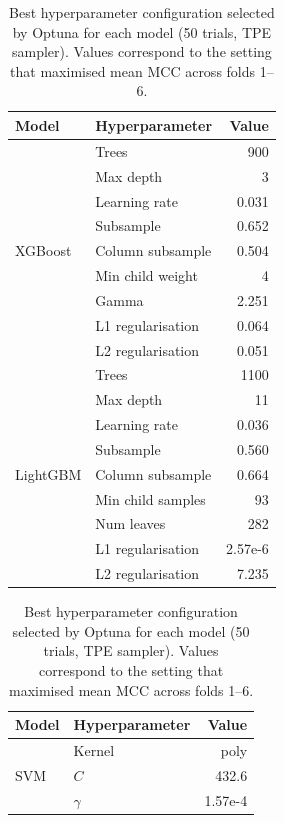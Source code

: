 \documentclass[final,3p,times,authoryear]{elsarticle}
\begin{document}
\begin{table}[H]
\centering
\caption{Best hyperparameter configuration selected by Optuna for each
  model (50 trials, TPE sampler). Values correspond to the setting that
  maximised mean MCC across folds 1--6.}
\label{tab:bestparams}
\small
\begin{minipage}[t]{0.47\linewidth}
\begin{tabular}{llr}
\hline
Model & Hyperparameter & Value \\
\hline
\multirow{9}{*}{XGBoost}
  & Trees                   & 900   \\
  & Max depth               & 3     \\
  & Learning rate           & 0.031 \\
  & Subsample               & 0.652 \\
  & Column subsample        & 0.504 \\
  & Min child weight        & 4     \\
  & Gamma                   & 2.251 \\
  & L1 regularisation       & 0.064 \\
  & L2 regularisation       & 0.051 \\
\hline
\multirow{9}{*}{LightGBM}
  & Trees                   & 1100      \\
  & Max depth               & 11        \\
  & Learning rate           & 0.036     \\
  & Subsample               & 0.560     \\
  & Column subsample        & 0.664     \\
  & Min child samples       & 93        \\
  & Num leaves              & 282       \\
  & L1 regularisation       & 2.57e{-6} \\
  & L2 regularisation       & 7.235     \\
\hline
\end{tabular}
\end{minipage}%
\hfill
\begin{minipage}[t]{0.47\linewidth}
\begin{tabular}{llr}
\hline
Model & Hyperparameter & Value \\
\hline
\multirow{5}{*}{SVM}
  & Kernel                  & poly      \\
  & $C$                     & 432.6     \\
  & $\gamma$                & 1.57e{-4} \\

\end{tabular}
\end{minipage}
\end{table}
\end{document}
